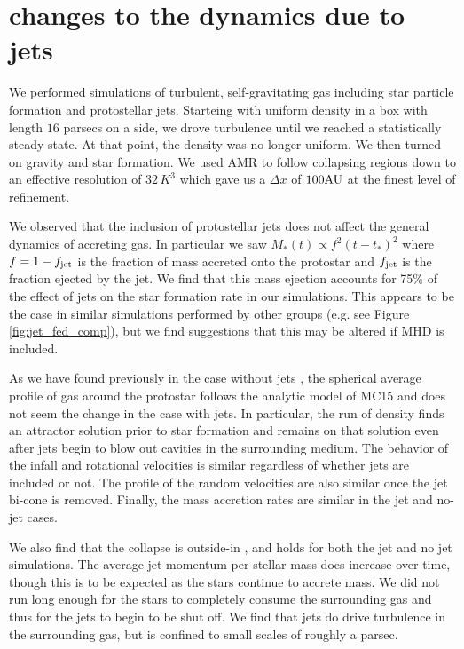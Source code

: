 \documentclass[../dissertation.tex]{subfiles}
\begin{document}
\section{changes to the dynamics due to jets}
We performed simulations of turbulent, self-gravitating gas including star particle formation and protostellar jets. 
Starteing with uniform density in a box with length $16$ parsecs on a side, we drove turbulence until we reached a statistically steady state.
At that point, the density was no longer uniform.
We then turned on gravity and star formation.
We used AMR to follow collapsing regions down to an effective resolution of $32 \, K^3$ which gave us a $\Delta x$ of $100 {\rm AU}$ at the finest level of refinement.

We observed that the inclusion of protostellar jets does not affect the general dynamics of accreting gas.
In particular we saw $M_*(t) \propto f^2 (t-t_*)^2$ where $f = 1 - f_{\rm jet}$ is the fraction of mass accreted onto the protostar and $f_{\rm jet}$ is the fraction ejected by the jet.
We find that this mass ejection accounts for 75\% of the effect of jets on the star formation rate in our simulations.
This appears to be the case in similar simulations performed by other groups (e.g. see Figure \ref{fig:jet_fed_comp}), but we find suggestions that this may be altered if MHD is included.

As we have found previously in the case without jets \citep{2017MNRAS.465.1316M}, the spherical average profile of gas around the protostar follows the analytic model of MC15 and does not seem the change in the case with jets.  In particular, the run of density finds an attractor solution prior to star formation and remains on that solution even after jets begin to blow out cavities in the surrounding medium.
The behavior of the infall and rotational velocities is similar regardless of whether jets are included or not.
The profile of the random velocities are also similar once the jet bi-cone is removed.  Finally, the mass accretion rates are similar in the jet and no-jet cases.

We also find that the collapse is outside-in  \citep{2017MNRAS.465.1316M}, and holds for both the jet and no jet simulations.
The average jet momentum per stellar mass does increase over time, though this is to be expected as the stars continue to accrete mass.
We did not run long enough for the stars to completely consume the surrounding gas and thus for the jets to begin to be shut off.
We find that jets do drive turbulence in the surrounding gas, but is confined to small scales of roughly a parsec.
\end{document}

